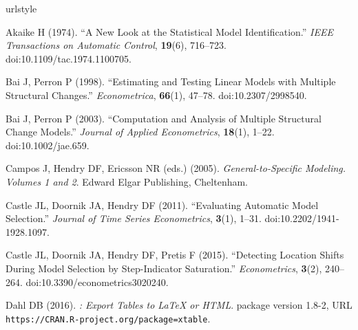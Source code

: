 \documentclass[article,nojss]{jss}
\begin{document}
%
\begin{thebibliography}{56}
	\newcommand{\enquote}[1]{``#1''}
	\providecommand{\natexlab}[1]{#1}
	\providecommand{\url}[1]{\texttt{#1}}
	\providecommand{\urlprefix}{URL }
	\expandafter\ifx\csname urlstyle\endcsname\relax
	\providecommand{\doi}[1]{doi:\discretionary{}{}{}#1}\else
	\providecommand{\doi}{doi:\discretionary{}{}{}\begingroup
		\urlstyle{rm}\Url}\fi
	\providecommand{\eprint}[2][]{\url{#2}}
	
	Akaike H (1974).
	\newblock \enquote{A New Look at the Statistical Model Identification.}
	\newblock \emph{IEEE Transactions on Automatic Control}, \textbf{19}(6),
	716--723.
	\newblock \doi{10.1109/tac.1974.1100705}.
	
	Bai J, Perron P (1998).
	\newblock \enquote{Estimating and Testing Linear Models with Multiple
		Structural Changes.}
	\newblock \emph{Econometrica}, \textbf{66}(1), 47--78.
	\newblock \doi{10.2307/2998540}.
	
	Bai J, Perron P (2003).
	\newblock \enquote{Computation and Analysis of Multiple Structural Change
		Models.}
	\newblock \emph{Journal of Applied Econometrics}, \textbf{18}(1), 1--22.
	\newblock \doi{10.1002/jae.659}.
	
	Campos J, Hendry DF, Ericsson NR (eds.) (2005).
	\newblock \emph{General-to-Specific Modeling. Volumes 1 and 2}.
	\newblock Edward Elgar Publishing, Cheltenham.
	
	Castle JL, Doornik JA, Hendry DF (2011).
	\newblock \enquote{Evaluating Automatic Model Selection.}
	\newblock \emph{Journal of Time Series Econometrics}, \textbf{3}(1), 1--31.
	\newblock \doi{10.2202/1941-1928.1097}.
	
	Castle JL, Doornik JA, Hendry DF, Pretis F (2015).
	\newblock \enquote{Detecting Location Shifts During Model Selection by
		Step-Indicator Saturation.}
	\newblock \emph{Econometrics}, \textbf{3}(2), 240--264.
	\newblock \doi{10.3390/econometrics3020240}.
	
	Dahl DB (2016).
	\newblock \emph{: Export Tables to \LaTeX{} or HTML}.
	\newblock {} package version 1.8-2,
	\urlprefix\url{https://CRAN.R-project.org/package=xtable}.
	

\end{thebibliography}
\end{document}
